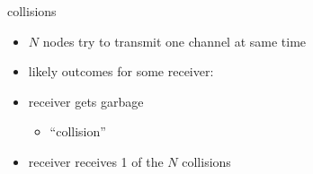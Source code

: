 \begin{frame}{collisions}
    \begin{itemize}
    \item $N$ nodes try to transmit one channel at same time
    \item likely outcomes for some receiver:
    \vspace{.5cm}
    \item receiver gets garbage
        \begin{itemize}
        \item ``collision''
        \end{itemize}
    \item receiver receives 1 of the $N$ collisions
    \end{itemize}
\end{frame}

